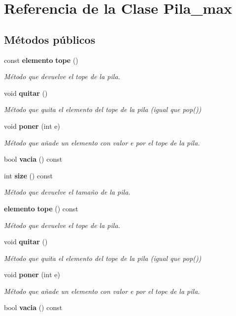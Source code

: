 \section{Referencia de la Clase Pila\+\_\+max}
\label{classPila__max}
\subsection*{Métodos públicos}
\begin{DoxyCompactItemize}
\item 
const {\bf elemento} {\bf tope} ()
\begin{DoxyCompactList}\small\item\em Método que devuelve el tope de la pila. \end{DoxyCompactList}\item 
void {\bf quitar} ()\label{classPila__max_ac4615eccf7d95bf4433e3da16c9aa2a2}

\begin{DoxyCompactList}\small\item\em Método que quita el elemento del tope de la pila (igual que pop()) \end{DoxyCompactList}\item 
void {\bf poner} (int e)
\begin{DoxyCompactList}\small\item\em Método que añade un elemento con valor e por el tope de la pila. \end{DoxyCompactList}\item 
bool {\bfseries vacia} () const \label{classPila__max_ab113c1ce4807788128d30b0dbe8c80f4}

\item 
int {\bf size} () const 
\begin{DoxyCompactList}\small\item\em Método que devuelve el tamaño de la pila. \end{DoxyCompactList}\item 
{\bf elemento} {\bf tope} () const 
\begin{DoxyCompactList}\small\item\em Método que devuelve el tope de la pila. \end{DoxyCompactList}\item 
void {\bf quitar} ()\label{classPila__max_ac4615eccf7d95bf4433e3da16c9aa2a2}

\begin{DoxyCompactList}\small\item\em Método que quita el elemento del tope de la pila (igual que pop()) \end{DoxyCompactList}\item 
void {\bf poner} (int e)
\begin{DoxyCompactList}\small\item\em Método que añade un elemento con valor e por el tope de la pila. \end{DoxyCompactList}\item 
bool {\bfseries vacia} () const \label{classPila__max_ab113c1ce4807788128d30b0dbe8c80f4}


\end{DoxyCompactItemize}
